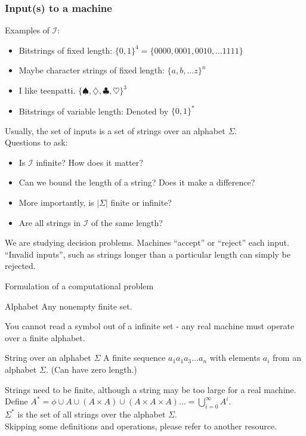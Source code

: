 \documentclass{beamer}
\begin{document}
\begin{frame}
\frametitle{Input(s) to a machine}
Examples of \(\mathcal{I}\):
\begin{itemize}
    \item Bitstrings of fixed length: \(\{0, 1\}^4 = \{0000, 0001, 0010, \dots 1111\} \)
    \item Maybe character strings of fixed length: \(\{a, b, \dots z\}^n\)
    \item I like teenpatti. \(\{ \spadesuit, \diamondsuit, \clubsuit, \heartsuit \}^3 \)
    \item Bitstrings of variable length: Denoted by \(\{0, 1\}^* \)
\end{itemize}
\end{frame}
\begin{frame}
Usually, the set of inputs is a set of \alert{strings} over an \alert{alphabet} $\Sigma$.\\
Questions to ask: \begin{itemize}
    \item Is $\mathcal{I}$ infinite? How does it matter?
    \item Can we bound the length of a string? Does it make a difference?
    \item More importantly, is $| \Sigma | $ finite or infinite?
    \item Are all strings in $\mathcal{I}$ of the same length?
\end{itemize}
\pause

We are studying decision problems. Machines ``accept'' or ``reject'' each input.\\
``Invalid inputs'', such as strings longer than a particular length can simply be rejected.
\end{frame}
\begin{frame}{Formulation of a computational problem}
\begin{block}{Alphabet}
Any nonempty finite set.
\end{block}
You cannot read a symbol out of a infinite set - any real machine must operate over a finite alphabet.\\
\pause
\begin{block}{String over an alphabet \(\Sigma\)}
A finite sequence $a_1a_1a_3\dots a_n$ with elements $a_i$ from an alphabet $\Sigma$. (Can have zero length.)
\end{block}
\pause
Strings need to be finite, although a string may be too large for a real machine.
\pause %
Define \( A^* = \phi \cup A \cup (A \times A) \cup (A \times A\times A)\dots = \bigcup_{i=0}^\infty A^i\). \\
\( \Sigma^*\) is the set of all strings over the alphabet $\Sigma$.\\Skipping some definitions and operations, please refer to another resource.
\end{frame}
\end{document}
